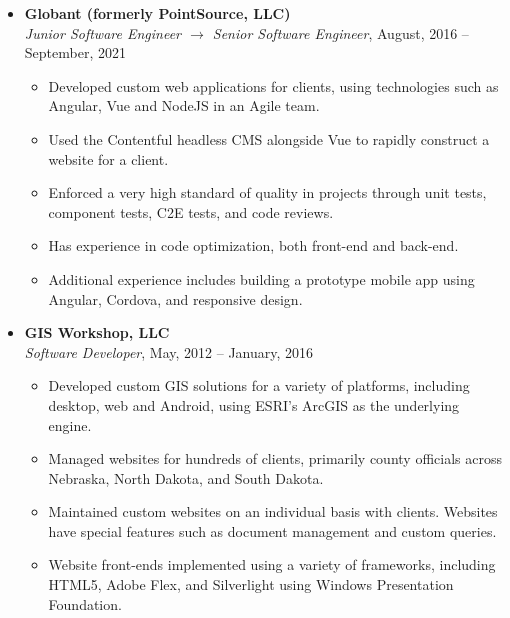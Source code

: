 \documentclass[12pt]{report}
\begin{document}
\begin{center}
{{\begin{itemize}
\item\textbf{Globant (formerly PointSource, LLC)}\\
\textit{Junior Software Engineer $\to$ Senior Software Engineer}, August, 2016 -- September, 2021
\begin{itemize}
\item Developed custom web applications for clients, using technologies such as Angular, Vue and NodeJS in an Agile team.
\item Used the Contentful headless CMS alongside Vue to rapidly construct a website for a client.
\item Enforced a very high standard of quality in projects through unit tests, component tests, C2E tests, and code reviews.
\item Has experience in code optimization, both front-end and back-end.
\item Additional experience includes building a prototype mobile app using Angular, Cordova, and responsive design.
\end{itemize}

\item\textbf{GIS Workshop, LLC}\\
\textit{Software Developer}, May, 2012 -- January, 2016
\begin{itemize}
\item Developed custom GIS solutions for a variety of platforms, including desktop, web and Android, using ESRI's ArcGIS as the underlying engine.
\item Managed websites for hundreds of clients, primarily county officials across Nebraska, North Dakota, and South Dakota.
\item Maintained custom websites on an individual basis with clients. Websites have special features such as document management and custom queries.
\item Website front-ends implemented using a variety of frameworks, including HTML5, Adobe Flex, and Silverlight using Windows Presentation Foundation.
\end{itemize}



\end{itemize}}}
\end{center}
\end{document}
